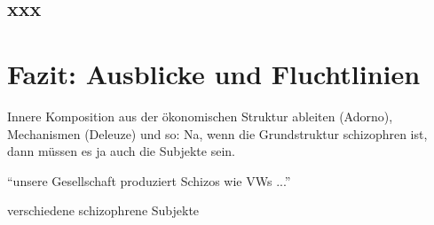 \documentclass[12pt,
               DIV13,
               paper=a4,
               twoside=false,
               onehalfspacing,
               bibliography=totoc,
               toc=graduated,
               draft,
               ]{scrartcl}
\begin{document}

\subsection{xxx}


\section{Fazit: Ausblicke und Fluchtlinien}

Innere Komposition aus der ökonomischen Struktur ableiten (Adorno),
Mechanismen (Deleuze) und so: Na, wenn die Grundstruktur schizophren
ist, dann müssen es ja auch die Subjekte sein.

"`unsere Gesellschaft produziert Schizos wie VWs ..."'

verschiedene schizophrene Subjekte


\newpage
\printshorthands
\printbibliography
\end{document}
